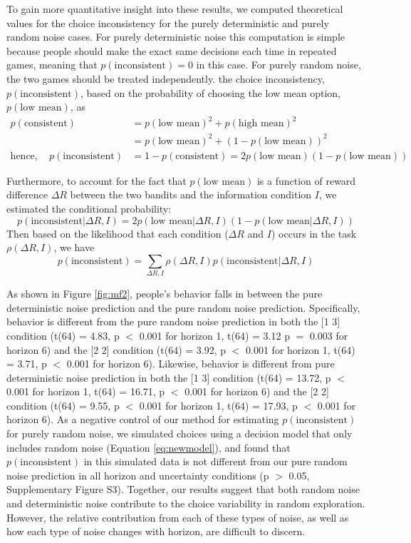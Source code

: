 \documentclass[12pt]{article}
\begin{document}
{To gain more quantitative insight into these results, we computed theoretical values for the choice inconsistency for the purely deterministic and purely random noise cases.  For purely deterministic noise this computation is simple because people should make the exact same decisions each time in repeated games, meaning that $p(\mbox{inconsistent}) = 0$ in this case. For purely random noise, the two games should be treated independently.  the choice inconsistency, $p(\mbox{inconsistent})$, based on the probability of choosing the low mean option, $p(\mbox{low mean})$, as
\begin{equation*}
	\begin{split}
		p(\mbox{consistent}) &= p(\mbox{low mean})^2 + p(\mbox{high mean})^2\\
		&= p(\mbox{low mean})^2 + (1-p(\mbox{low mean}))^2\\ 
		\mbox{hence},\quad p(\mbox{inconsistent}) &=  
		1 - p(\mbox{consistent}) = 
		2 p(\mbox{low mean})(1-p(\mbox{low mean}))
	\end{split}
\end{equation*}

Furthermore, to account for the fact that $p(\mbox{low mean})$ is a function of reward difference $\Delta R$ between the two bandits and the information condition $I$, we estimated the conditional probability:
	$$p(\mbox{inconsistent}|\Delta R, I) = 2 p(\mbox{low mean}|\Delta R, I)(1-p(\mbox{low mean}|\Delta R, I))$$
	Then based on the likelihood that each condition ($\Delta R$ and $I$) occurs in the task $\rho(\Delta R, I)$, we have
	$$p(\mbox{inconsistent}) = \sum_{\Delta R, I}\rho(\Delta R, I)p(\mbox{inconsistent}|\Delta R, I)$$

As shown in Figure \ref{fig:mf2}, people's behavior falls in between the pure deterministic noise prediction and the pure random noise prediction. Specifically, behavior is different from the pure random noise prediction in both the [1 3] condition (t(64) = 4.83, p $<$ 0.001 for horizon 1, t(64) = 3.12 p $=$ 0.003 for horizon 6) and the [2 2] condition (t(64) = 3.92, p $<$ 0.001 for horizon 1, t(64) = 3.71, p $<$ 0.001 for horizon 6). Likewise, behavior is different from pure deterministic noise prediction in both the [1 3] condition (t(64) = 13.72, p $<$ 0.001 for horizon 1, t(64) = 16.71, p $<$ 0.001 for horizon 6) and the [2 2] condition (t(64) = 9.55, p $<$ 0.001 for horizon 1, t(64) = 17.93, p $<$ 0.001 for horizon 6). As a negative control of our method for estimating $p(\mbox{inconsistent})$ for purely random noise, we simulated choices using a decision model that only includes random noise (Equation \ref{eq:newmodel}), and found that $p(\mbox{inconsistent})$ in this simulated data is not different from our pure random noise prediction in all horizon and uncertainty conditions (p $>$ 0.05, Supplementary Figure S3). Together, our results suggest that both random noise and deterministic noise contribute to the choice variability in random exploration. However, the relative contribution from each of these types of noise, as well as how each type of noise changes with horizon, are difficult to discern.

}
\end{document}
